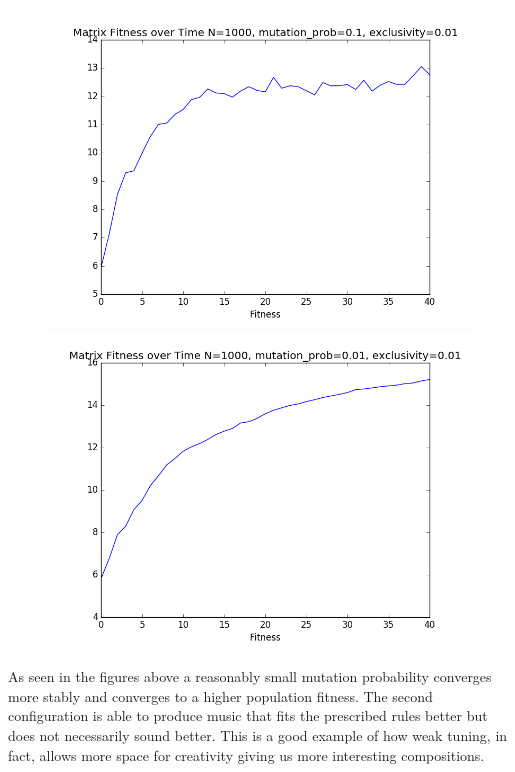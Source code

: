 \documentclass{article}
\begin{document}
\begin{figure}[H]
\centering
\begin{minipage}{.5\textwidth}
  \centering
  \includegraphics[width=1\linewidth]{../graphs/fitness1.png}
\end{minipage}%
\begin{minipage}{.5\textwidth}
  \centering
  \includegraphics[width=1\linewidth]{../graphs/fitness2.png}
\end{minipage}
\end{figure}

As seen in the figures above a reasonably small mutation probability converges more stably and converges to a higher population fitness. The second configuration is able to produce music that fits the prescribed rules better but does not necessarily sound better. This is a good example of how weak tuning, in fact, allows more space for creativity giving us more interesting compositions.
\end{document}
